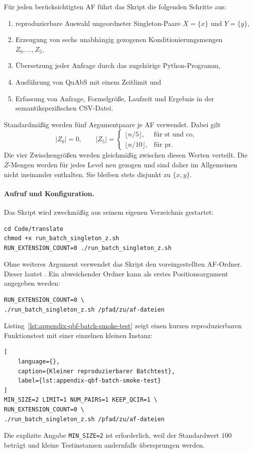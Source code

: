 Für jeden berücksichtigten AF führt das Skript die folgenden Schritte
aus:
\begin{enumerate}
    \item reproduzierbare Auswahl ungeordneter Singleton-Paare
          \(X=\{x\}\) und \(Y=\{y\}\),
    \item Erzeugung von sechs unabhängig gezogenen
          Konditionierungsmengen \(Z_0,\ldots,Z_5\),
    \item Übersetzung jeder Anfrage durch das zugehörige
          Python-Programm,
    \item Ausführung von QuAbS mit einem Zeitlimit und
    \item Erfassung von Anfrage, Formelgröße, Laufzeit und Ergebnis in
          der semantikspezifischen CSV-Datei.
\end{enumerate}
Standardmäßig werden fünf Argumentpaare je AF verwendet. Dabei gilt
\[
|Z_0|=0,
\qquad
|Z_5|=
\begin{cases}
\lfloor n/5\rfloor,
    &\text{für }\mathrm{st}\text{ und }\mathrm{co},\\
\lfloor n/10\rfloor,
    &\text{für }\mathrm{pr}.
\end{cases}
\]
Die vier Zwischengrößen werden gleichmäßig zwischen diesen Werten
verteilt. Die \(Z\)-Mengen werden für jedes Level neu gezogen und sind
daher im Allgemeinen nicht ineinander enthalten. Sie bleiben stets
disjunkt zu \(\{x,y\}\).

\paragraph{Aufruf und Konfiguration.}
Das Skript wird zweckmäßig aus seinem eigenen Verzeichnis gestartet:
\begin{lstlisting}[language={}]
cd Code/translate
chmod +x run_batch_singleton_z.sh
RUN_EXTENSION_COUNT=0 ./run_batch_singleton_z.sh
\end{lstlisting}
Ohne weiteres Argument verwendet das Skript den voreingestellten
AF-Ordner. Dieser lautet .
Ein abweichender Ordner kann als erstes Positionsargument angegeben werden:
\begin{lstlisting}[language={}]
RUN_EXTENSION_COUNT=0 \
./run_batch_singleton_z.sh /pfad/zu/af-dateien
\end{lstlisting}
Listing~\ref{lst:appendix-qbf-batch-smoke-test} zeigt einen kurzen
reproduzierbaren Funktionstest mit einer einzelnen kleinen Instanz:
\begin{lstlisting}[
    language={},
    caption={Kleiner reproduzierbarer Batchtest},
    label={lst:appendix-qbf-batch-smoke-test}
]
MIN_SIZE=2 LIMIT=1 NUM_PAIRS=1 KEEP_QCIR=1 \
RUN_EXTENSION_COUNT=0 \
./run_batch_singleton_z.sh /pfad/zu/af-dateien
\end{lstlisting}
Die explizite Angabe \texttt{MIN\_SIZE=2} ist erforderlich, weil der
Standardwert \(100\) beträgt und kleine Testinstanzen andernfalls
übersprungen werden.

